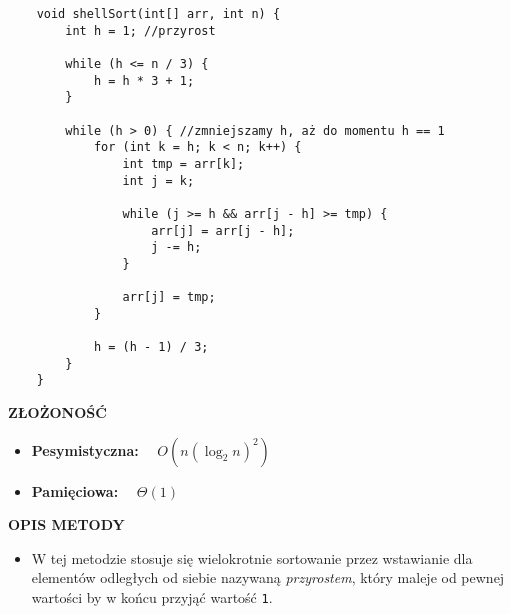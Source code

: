 \documentclass[advanced-sorts.tex]{subfiles}
\begin{document}
    \begin{verbatim}
    void shellSort(int[] arr, int n) {
        int h = 1; //przyrost

        while (h <= n / 3) {
            h = h * 3 + 1;
        }

        while (h > 0) { //zmniejszamy h, aż do momentu h == 1
            for (int k = h; k < n; k++) {
                int tmp = arr[k];
                int j = k;

                while (j >= h && arr[j - h] >= tmp) {
                    arr[j] = arr[j - h];
                    j -= h;
                }

                arr[j] = tmp;
            }

            h = (h - 1) / 3;
        }
    }
    \end{verbatim}

    \textbf{ZŁOŻONOŚĆ}
    \begin{itemize}
        \item \textbf{Pesymistyczna:} ~~$O(n (\log_2 n)^2)$
        \item \textbf{Pamięciowa:} ~~$\Theta(1)$
    \end{itemize}

    \textbf{OPIS METODY}
    \begin{itemize}
        \item W tej metodzie stosuje się wielokrotnie sortowanie przez
            wstawianie dla elementów odległych od siebie nazywaną
            \textit{przyrostem}, który maleje od pewnej wartości by w końcu
            przyjąć wartość \texttt{1}.
    \end{itemize}
\end{document}
